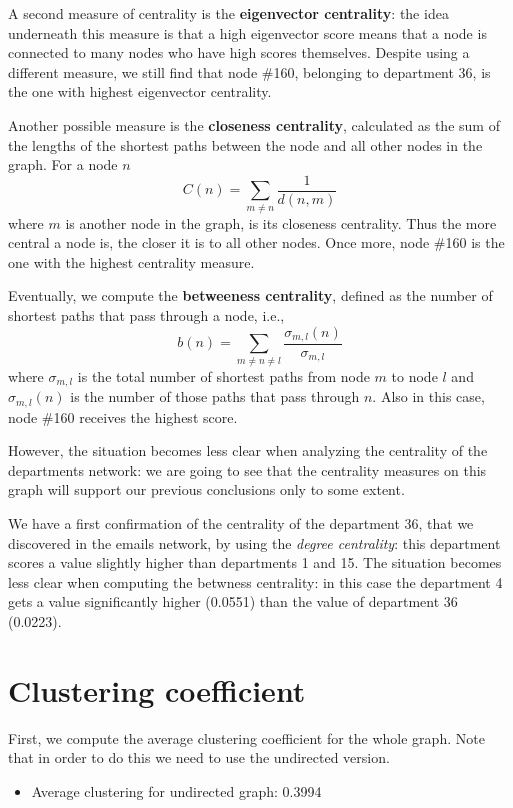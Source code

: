 \documentclass{report}
\theoremstyle{definition}
\theoremstyle{remark}
\begin{document}
A second measure of centrality is the \textbf{eigenvector centrality}: the idea underneath this measure is that a high eigenvector score means that a node is connected to many nodes who have high scores themselves. Despite using a different measure, we still find that node \#160, belonging to department 36, is the one with highest eigenvector centrality.

Another possible measure is the \textbf{closeness centrality}, calculated as the sum of the lengths of the shortest paths between the node and all other nodes in the graph. For a node $n$ 
\begin{equation*}
C(n) = \sum_{m \neq n}\frac{1}{d(n,m)}
\end{equation*}
where $m$ is another node in the graph, is its closeness centrality.
Thus the more central a node is, the closer it is to all other nodes. Once more, node \#160 is the one with the highest centrality measure.

Eventually, we compute the \textbf{betweeness centrality}, defined as the number of shortest paths that pass through a node, i.e., 
\begin{equation*}
b(n) = \sum_{m \neq n\neq l} \frac{\sigma_{m,l}(n)}{\sigma_{m,l}}
\end{equation*}
where $\sigma _{m,l}$ is the total number of shortest paths from node $m$ to node $l$ and  $\sigma_{m,l}(n)$ is the number of those paths that pass through $n$. Also in this case, node \#160 receives the highest score.

However, the situation becomes less clear when analyzing the centrality of the departments network: we are going to see that the centrality measures on this graph will support our previous conclusions only to some extent.

We have a first confirmation of the centrality of the department 36, that we discovered in the emails network, by using the \textit{degree centrality}: this department scores a value slightly higher than departments 1 and 15. The situation becomes less clear when computing the betwness centrality: in this case the department 4 gets a value significantly higher (0.0551) than the value of department 36 (0.0223).
\section*{Clustering coefficient}
First, we compute the average clustering coefficient for the whole graph. Note that in order to do this we need to use the undirected version.
\begin{itemize}
	\item Average clustering for undirected graph: 0.3994
\end{itemize}
\end{document}
